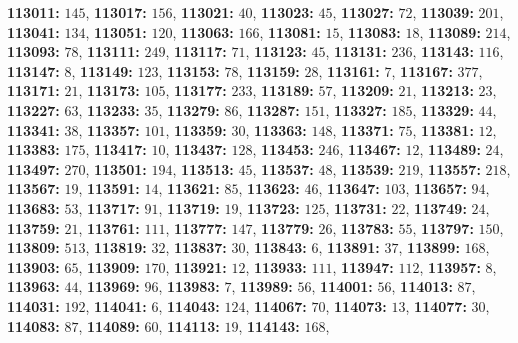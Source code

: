 \textsf{\bfseries 113011:} $145$, \textsf{\bfseries 113017:} $156$, \textsf{\bfseries 113021:} $40$, \textsf{\bfseries 113023:} $45$, \textsf{\bfseries 113027:} $72$, \textsf{\bfseries 113039:} $201$, \textsf{\bfseries 113041:} $134$, \textsf{\bfseries 113051:} $120$, \textsf{\bfseries 113063:} $166$, \textsf{\bfseries 113081:} $15$, \textsf{\bfseries 113083:} $18$, \textsf{\bfseries 113089:} $214$, \textsf{\bfseries 113093:} $78$, \textsf{\bfseries 113111:} $249$, \textsf{\bfseries 113117:} $71$, \textsf{\bfseries 113123:} $45$, \textsf{\bfseries 113131:} $236$, \textsf{\bfseries 113143:} $116$, \textsf{\bfseries 113147:} $8$, \textsf{\bfseries 113149:} $123$, \textsf{\bfseries 113153:} $78$, \textsf{\bfseries 113159:} $28$, \textsf{\bfseries 113161:} $7$, \textsf{\bfseries 113167:} $377$, \textsf{\bfseries 113171:} $21$, \textsf{\bfseries 113173:} $105$, \textsf{\bfseries 113177:} $233$, \textsf{\bfseries 113189:} $57$, \textsf{\bfseries 113209:} $21$, \textsf{\bfseries 113213:} $23$, \textsf{\bfseries 113227:} $63$, \textsf{\bfseries 113233:} $35$, \textsf{\bfseries 113279:} $86$, \textsf{\bfseries 113287:} $151$, \textsf{\bfseries 113327:} $185$, \textsf{\bfseries 113329:} $44$, \textsf{\bfseries 113341:} $38$, \textsf{\bfseries 113357:} $101$, \textsf{\bfseries 113359:} $30$, \textsf{\bfseries 113363:} $148$, \textsf{\bfseries 113371:} $75$, \textsf{\bfseries 113381:} $12$, \textsf{\bfseries 113383:} $175$, \textsf{\bfseries 113417:} $10$, \textsf{\bfseries 113437:} $128$, \textsf{\bfseries 113453:} $246$, \textsf{\bfseries 113467:} $12$, \textsf{\bfseries 113489:} $24$, \textsf{\bfseries 113497:} $270$, \textsf{\bfseries 113501:} $194$, \textsf{\bfseries 113513:} $45$, \textsf{\bfseries 113537:} $48$, \textsf{\bfseries 113539:} $219$, \textsf{\bfseries 113557:} $218$, \textsf{\bfseries 113567:} $19$, \textsf{\bfseries 113591:} $14$, \textsf{\bfseries 113621:} $85$, \textsf{\bfseries 113623:} $46$, \textsf{\bfseries 113647:} $103$, \textsf{\bfseries 113657:} $94$, \textsf{\bfseries 113683:} $53$, \textsf{\bfseries 113717:} $91$, \textsf{\bfseries 113719:} $19$, \textsf{\bfseries 113723:} $125$, \textsf{\bfseries 113731:} $22$, \textsf{\bfseries 113749:} $24$, \textsf{\bfseries 113759:} $21$, \textsf{\bfseries 113761:} $111$, \textsf{\bfseries 113777:} $147$, \textsf{\bfseries 113779:} $26$, \textsf{\bfseries 113783:} $55$, \textsf{\bfseries 113797:} $150$, \textsf{\bfseries 113809:} $513$, \textsf{\bfseries 113819:} $32$, \textsf{\bfseries 113837:} $30$, \textsf{\bfseries 113843:} $6$, \textsf{\bfseries 113891:} $37$, \textsf{\bfseries 113899:} $168$, \textsf{\bfseries 113903:} $65$, \textsf{\bfseries 113909:} $170$, \textsf{\bfseries 113921:} $12$, \textsf{\bfseries 113933:} $111$, \textsf{\bfseries 113947:} $112$, \textsf{\bfseries 113957:} $8$, \textsf{\bfseries 113963:} $44$, \textsf{\bfseries 113969:} $96$, \textsf{\bfseries 113983:} $7$, \textsf{\bfseries 113989:} $56$, \textsf{\bfseries 114001:} $56$, \textsf{\bfseries 114013:} $87$, \textsf{\bfseries 114031:} $192$, \textsf{\bfseries 114041:} $6$, \textsf{\bfseries 114043:} $124$, \textsf{\bfseries 114067:} $70$, \textsf{\bfseries 114073:} $13$, \textsf{\bfseries 114077:} $30$, \textsf{\bfseries 114083:} $87$, \textsf{\bfseries 114089:} $60$, \textsf{\bfseries 114113:} $19$, \textsf{\bfseries 114143:} $168$, 
